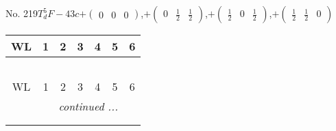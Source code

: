 \documentclass[fleqn,9pt,landscape]{jsarticle}
\begin{document}
\newpage
No. 219\quad$T_{d}^{5}$\quad$F-43c$\quad[ cubic ]\quad$+\begin{pmatrix} 0 & 0 & 0 \end{pmatrix}$,\quad $+\begin{pmatrix} 0 & \frac{1}{2} & \frac{1}{2} \end{pmatrix}$,\quad $+\begin{pmatrix} \frac{1}{2} & 0 & \frac{1}{2} \end{pmatrix}$,\quad $+\begin{pmatrix} \frac{1}{2} & \frac{1}{2} & 0 \end{pmatrix}$
\begin{center}
\renewcommand{\arraystretch}{1.2}
\begin{longtable}{ccccccc}
 \hline \hline
WL & 1 & 2 & 3 & 4 & 5 & 6 \\ \hline \endfirsthead

\multicolumn{6}{l}{\tablename\ \thetable{}} \\
 \hline \hline
WL & 1 & 2 & 3 & 4 & 5 & 6 \\ \hline \endhead

 \hline \hline
\multicolumn{6}{r}{\footnotesize\it continued ...} \\ \endfoot

 \hline \hline
\multicolumn{6}{r}{} \\ \endlastfoot


\end{longtable}
\end{center}
\end{document}
